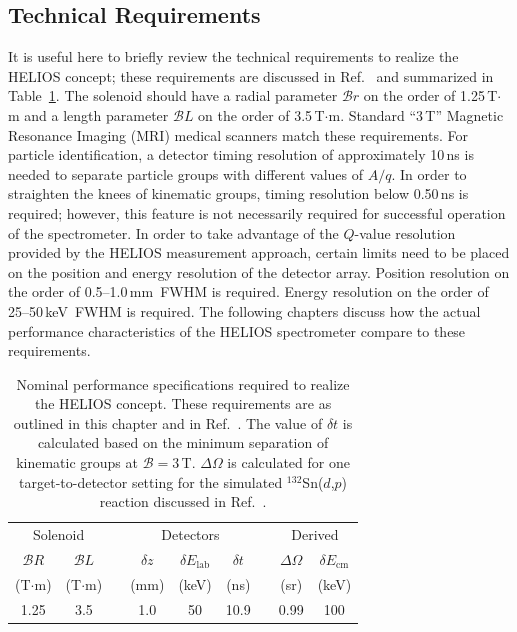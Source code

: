\subsection{Technical Requirements}
It is useful here to briefly review the technical requirements to realize the HELIOS concept; these requirements are discussed in Ref.~\cite{Wuosmaa_2007} and summarized in Table~\ref{helios_req}.  The solenoid should have a radial parameter $\mathscr{B}r$ on the order of 1.25\,T$\cdot$m and a length parameter $\mathscr{B}L$ on the order of 3.5\,T$\cdot$m.  Standard ``3\,T'' Magnetic Resonance Imaging (MRI) medical scanners match these requirements.  For particle identification, a detector timing resolution of approximately 10\,ns is needed to separate particle groups with different values of $A/q$.  In order to straighten the knees of kinematic groups, timing resolution below 0.50\,ns is required; however, this feature is not necessarily required for successful operation of the spectrometer.  In order to take advantage of the $Q$-value resolution provided by the HELIOS measurement approach, certain limits need to be placed on the position and energy resolution of the detector array.  Position resolution on the order of 0.5--1.0\,mm~FWHM is required.  Energy resolution on the order of 25--50\,keV~FWHM is required.  The following chapters discuss how the actual performance characteristics of the HELIOS spectrometer compare to these requirements.

\begin{table}[b]
\centering
\begin{tabular}{ccccccccc}
\hline
\multicolumn{2}{c}{Solenoid}  &  &
\multicolumn{3}{c}{Detectors}  & & 
\multicolumn{2}{c}{Derived}\\ \cline{1-2} \cline{4-6} \cline{8-9}
\multicolumn{1}{c}{$\mathscr{B}R$}  &  
\multicolumn{1}{c}{$\mathscr{B}L$}  & &
\multicolumn{1}{c}{$\delta z$}  &  
\multicolumn{1}{c}{$\delta E_\textrm{lab}$} &
\multicolumn{1}{c}{$\delta t$} &&
\multicolumn{1}{c}{$\Delta \Omega$}  &  
\multicolumn{1}{c}{$\delta E_\mathrm{cm}$}  \\
(T$\cdot$m)&(T$\cdot$m)&&(mm)&(keV)&(ns)&&(sr)&(keV)\\
\hline \hline
1.25&3.5&&1.0&50&10.9&&0.99&100
\\
\hline 
\end{tabular}
\caption[Nominal performance specifications required to realize the HELIOS concept]{Nominal performance specifications required to realize the HELIOS concept.  These requirements are as outlined in this chapter and in Ref.~\cite{Wuosmaa_2007}.  The value of $\delta t$ is calculated based on the minimum separation of kinematic groups at $\mathscr{B}=3$\,T.  $\Delta \Omega$ is calculated for one target-to-detector setting for the simulated $^{132}$Sn($d$,$p$) reaction discussed in Ref.~\cite{Wuosmaa_2007}.}
\label{helios_req}
\end{table}